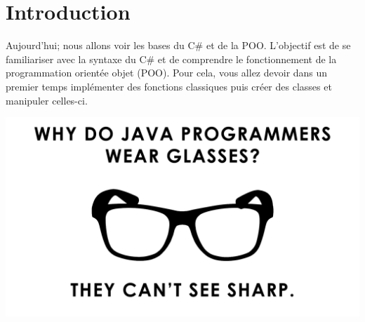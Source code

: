 \section{Introduction}

Aujourd'hui; nous allons voir les bases du C\# et de la POO. L'objectif est de se familiariser avec la syntaxe du C\# et de comprendre le fonctionnement de la programmation orientée objet (POO). Pour cela, vous allez devoir dans un premier temps implémenter des fonctions classiques puis créer des classes et manipuler celles-ci.

\begin{center}
  \includegraphics[width=\textwidth]{img/intro.png}
\end{center}